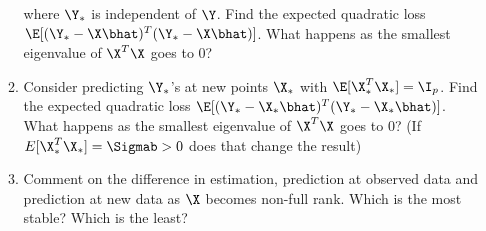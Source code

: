 \documentclass{article}
\begin{document}
\begin{enumerate}
\begin{enumerate}
  where $\Y_*$ is independent of $\Y$.  Find the expected quadratic
  loss $\E[(\Y_* - \X\bhat)^T(\Y_* - \X\bhat)]$.  What happens as the
  smallest eigenvalue of $\X^T\X$ goes to 0?
\item Consider predicting $\Y_*$'s at new points $\X_*$ with
  $\E[\X_*^T\X_*] = \I_p$.  Find the expected quadratic loss
  $\E[(\Y_* - \X_*\bhat)^T(\Y_* - \X_*\bhat)]$.  What
  happens as the smallest eigenvalue of $\X^T\X$ goes to 0?  (If
  $E[\X_*^T\X_*] = \Sigmab > 0$ does that change the result)
\item Comment on the difference in estimation, prediction at observed
  data and prediction at new data as $\X$ becomes non-full rank.
  Which is the most stable?  Which is the least?
  \end{enumerate}
\end{enumerate}
\end{document}
